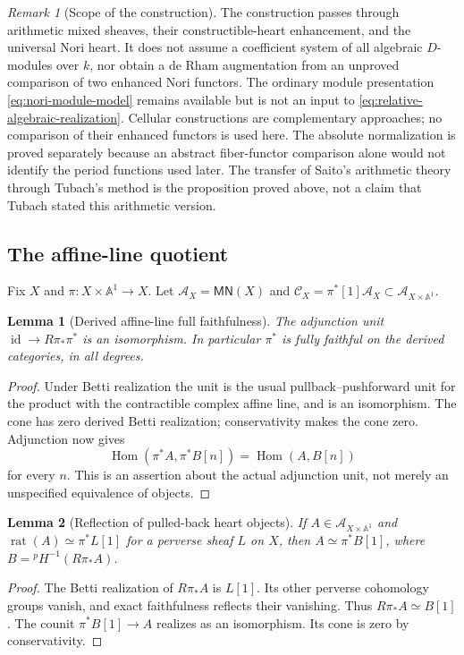 \documentclass[11pt]{article}
\numberwithin{equation}{section}
\newtheorem{lemma}[lemma]{Lemma}
\theoremstyle{definition}
\theoremstyle{remark}
\newtheorem{remark}[remark]{Remark}
\newcommand{\A}{\mathbb A}
\newcommand{\Ccal}{\mathcal C}
\newcommand{\MN}{\mathsf{MN}}
\newcommand{\rat}{\operatorname{rat}}
\newcommand{\Hom}{\operatorname{Hom}}
\newcommand{\id}{\operatorname{id}}
\newcommand{\pH}{{}^{p}\!H}
\begin{document}
\begin{remark}[Scope of the construction]\label{rem:interface-discharge}
The construction passes through arithmetic mixed sheaves, their
constructible-heart enhancement, and the universal Nori heart. It does
not assume a coefficient system of all algebraic $D$-modules over $k$,
nor obtain a de Rham augmentation from an unproved comparison of two
enhanced Nori functors. The ordinary module presentation
\eqref{eq:nori-module-model} remains available but is not an input to
\eqref{eq:relative-algebraic-realization}. Cellular constructions
\cite{ChoudhuryGallauer,Harrer} are complementary approaches; no
comparison of their enhanced functors is used here. The absolute normalization is
proved separately because an abstract fiber-functor comparison alone
would not identify the period functions used later. The transfer of
Saito's arithmetic theory through Tubach's method is the proposition
proved above, not a claim that Tubach stated this arithmetic version.
\end{remark}

\subsection{The affine-line quotient}

Fix $X$ and $\pi:X\times\A^1\to X$. Let
$\mathcal A_X=\MN(X)$ and
$\Ccal_X=\pi^*[1]\mathcal A_X\subset\mathcal A_{X\times\A^1}$.

\begin{lemma}[Derived affine-line full faithfulness]\label{lem:affine-ff}
The adjunction unit $\id\to R\pi_*\pi^*$ is an isomorphism. In particular
$\pi^*$ is fully faithful on the derived categories, in all degrees.
\end{lemma}
\begin{proof}
Under Betti realization the unit is the usual pullback--pushforward unit
for the product with the contractible complex affine line, and is an
isomorphism. The cone has zero derived Betti realization; conservativity
makes the cone zero. Adjunction now gives
\[
 \Hom(\pi^*A,\pi^*B[n])=\Hom(A,B[n])
\]
for every $n$. This is an assertion about the actual adjunction unit, not
merely an unspecified equivalence of objects.
\end{proof}

\begin{lemma}[Reflection of pulled-back heart objects]\label{lem:ordinary-reflection}\label{lem:constant-reflection}
If $A\in\mathcal A_{X\times\A^1}$ and
$\rat(A)\simeq\pi^*L[1]$ for a perverse sheaf $L$ on $X$, then
$A\simeq\pi^*B[1]$, where $B=\pH^{-1}(R\pi_*A)$.
\end{lemma}
\begin{proof}
The Betti realization of $R\pi_*A$ is $L[1]$. Its other perverse
cohomology groups vanish, and exact faithfulness reflects their vanishing.
Thus $R\pi_*A\simeq B[1]$. The counit
$\pi^*B[1]\to A$ realizes as an isomorphism. Its cone is zero by
conservativity.
\end{proof}
\end{document}
